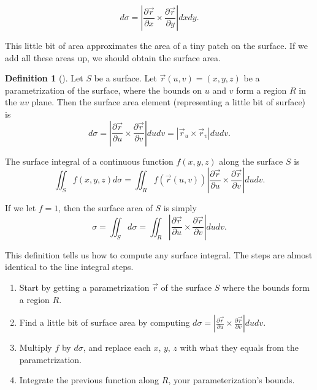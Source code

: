 \documentclass[10pt,]{book}
\theoremstyle{plain}
\theoremstyle{definition}
\newtheorem{definition}[theorem]{Definition}
\theoremstyle{definition}
\theoremstyle{definition}
\theoremstyle{definition}
\theoremstyle{definition}
\numberwithin{equation}{section}
\begin{document}
\begin{equation*}
d\sigma =\left |\frac{\partial \vec r}{\partial x} \times \frac{\partial \vec r}{\partial y}\right| dxdy.
\end{equation*}
%
\par
This little bit of area approximates the area of a tiny patch on the surface. If we add all these areas up, we should obtain the surface area.%
\begin{definition}[{}]\label{definition-45}
Let \(S\) be a surface. Let \(\vec r(u,v)=(x,y,z)\) be a parametrization of the surface, where the bounds on \(u\) and \(v\) form a region \(R\) in the \(uv\) plane. Then the surface area element (representing a little bit of surface) is%
\begin{equation*}
d\sigma =\left |\frac{\partial \vec r}{\partial u} \times \frac{\partial \vec r}{\partial v}\right| dudv = \left|\vec r_u\times\vec r_v\right|dudv.
\end{equation*}
%
\par
The surface integral of a continuous function \(f(x,y,z)\) along the surface \(S\) is%
\begin{equation*}
\iint_S f(x,y,z) d\sigma = \iint_R f(\vec r(u,v)) \left |\frac{\partial \vec r}{\partial u} \times \frac{\partial \vec r}{\partial v}\right| dudv.
\end{equation*}
%
\par
If we let \(f=1\), then the surface area of \(S\) is simply%
\begin{equation*}
\sigma = \iint_S d\sigma = \iint_R \left |\frac{\partial \vec r}{\partial u} \times \frac{\partial \vec r}{\partial v}\right| dudv.
\end{equation*}
%
\end{definition}
This definition tells us how to compute any surface integral. The steps are almost identical to the line integral steps. \leavevmode%
\begin{enumerate}
\item\hypertarget{li-203}{}Start by getting a parametrization \(\vec r\) of the surface \(S\) where the bounds form a region \(R\).%
\item\hypertarget{li-204}{}Find a little bit of surface area by computing \(d\sigma =\left |\frac{\partial \vec r}{\partial u} \times \frac{\partial \vec r}{\partial v}\right| dudv.\)%
\item\hypertarget{li-205}{}Multiply \(f\) by \(d\sigma\), and replace each \(x\), \(y\), \(z\) with what they equals from the parametrization.%
\item\hypertarget{li-206}{}Integrate the previous function along \(R\), your parameterization's bounds.%
\end{enumerate}
\end{document}
